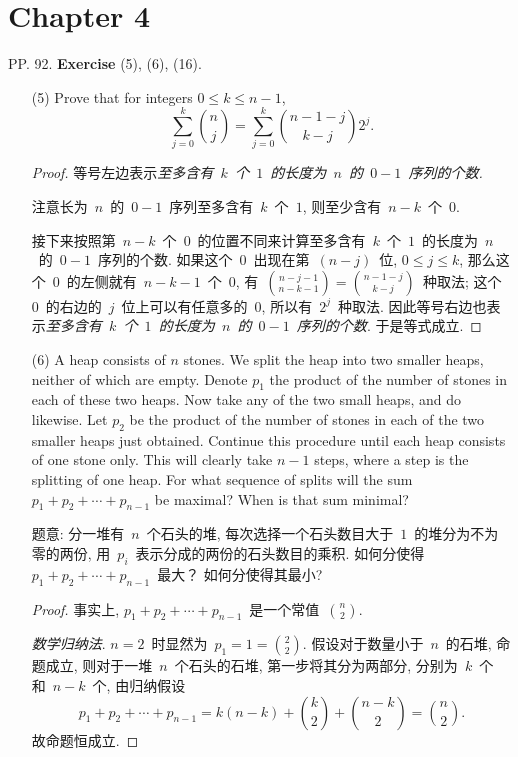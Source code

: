 \documentclass[UTF8,a4paper,10pt]{article}
\begin{document}
\section*{Chapter 4}
PP. 92. {\bf Exercise} (5), (6), (16).
\begin{enumerate}
	\item[(5)] Prove that for integers $0 \leqslant k \leqslant n-1$,
	      \[
		      \sum_{j=0}^k \binom{n}{j}=\sum_{j=0}^{k} \binom{n-1-j}{k-j} 2^j.
	      \]
	      \begin{proof}
		      等号左边表示\emph{至多含有~$k$~个~$1$~的长度为~$n$~的~$0-1$~序列的个数.}

		      注意长为~$n$~的~$0-1$~序列至多含有~$k$~个~$1$, 则至少含有~$n-k$~个~$0$.

		      接下来按照第~$n-k$~个~$0$~的位置不同来计算至多含有~$k$~个~$1$~的长度为~$n$~的~$0-1$~序列的个数. 如果这个~$0$~出现在第~$(n-j)$~位, $0\leqslant j\leqslant k$, 那么这个~$0$~的左侧就有~$n-k-1$~个~$0$, 有~$\displaystyle\binom{n-j-1}{n-k-1}=\binom{n-1-j}{k-j}$~种取法; 这个~$0$~的右边的~$j$~位上可以有任意多的~$0$, 所以有~$2^j$~种取法. 因此等号右边也表示\emph{至多含有~$k$~个~$1$~的长度为~$n$~的~$0-1$~序列的个数}. 于是等式成立.
	      \end{proof}

	\item[(6)] A heap consists of $n$ stones. We split the heap into two smaller heaps, neither of which are empty. Denote $p_1$ the product of the number of stones in each of these two heaps. Now take any of the two small heaps, and do likewise. Let $p_2$ be the product of the number of stones in each of the two smaller heaps just obtained. Continue this procedure until each heap consists of one stone only. This will clearly take $n-1$ steps, where a step is the splitting of one heap. For what sequence of splits will the sum $p_1 + p_2 + \cdots + p_{n-1}$ be maximal? When is that sum minimal?

	      题意: 分一堆有~$n$~个石头的堆, 每次选择一个石头数目大于~$1$~的堆分为不为零的两份, 用~$p_i$~表示分成的两份的石头数目的乘积. 如何分使得~$p_1+p_2+\cdots+p_{n-1}$~最大？ 如何分使得其最小?
	      \begin{proof}
		      事实上, $p_1+p_2+\cdots+p_{n-1}$~是一个常值~$\displaystyle\binom{n}{2}$.

		      \emph{数学归纳法}. $n=2$~时显然为~$p_1=1=\displaystyle\binom{2}{2}$. 假设对于数量小于~$n$~的石堆, 命题成立, 则对于一堆~$n$~个石头的石堆, 第一步将其分为两部分, 分别为~$k$~个和~$n-k$~个, 由归纳假设
		      \[
			      p_1+p_2+\cdots+p_{n-1}=k(n-k)+\binom{k}{2}+\binom{n-k}{2}=\binom{n}{2}.
		      \]
		      故命题恒成立.
	      \end{proof}


\end{enumerate}
\end{document}
